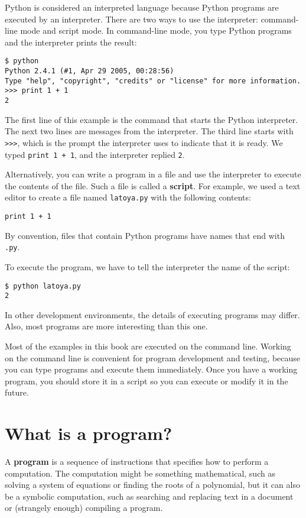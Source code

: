 Python is considered an interpreted language because Python
programs are executed by an interpreter.  There are two ways to
use the interpreter: command-line mode and script mode. In
command-line mode, you type Python programs and the interpreter
prints the result:

\pagebreak
\beforeverb
\begin{verbatim}
$ python
Python 2.4.1 (#1, Apr 29 2005, 00:28:56)
Type "help", "copyright", "credits" or "license" for more information.
>>> print 1 + 1
2
\end{verbatim}
\afterverb
%
The first line of this example is the command that starts the
Python interpreter.  The next two lines are messages from the
interpreter.  The third line starts with {\tt >>>}, which is the
prompt the interpreter uses to indicate that it is ready.  We typed
{\tt print 1 + 1}, and the interpreter replied {\tt 2}.

Alternatively, you can write a program in a file and use the
interpreter to execute the contents of the file.  Such a file is
called a {\bf script}.  For example, we used a text editor to
create a file named {\tt latoya.py} with the following contents:


\beforeverb
\begin{verbatim}
print 1 + 1
\end{verbatim}
\afterverb
%
By convention, files that contain Python programs have names that
end with {\tt .py}.

To execute the program, we have to tell the interpreter the name of
the script:


\beforeverb
\begin{verbatim}
$ python latoya.py
2
\end{verbatim}
\afterverb
%
In other development environments, the details of executing programs
may differ.  Also, most programs are more interesting than this one.

Most of the examples in this book are executed on the command line.
Working on the command line is convenient for program development and
testing, because you can type programs and execute them
immediately.  Once you have a working program, you should store
it in a script so you can execute or modify it in the future.


\section{What is a program?}

A {\bf program} is a sequence of instructions that specifies how to
perform a computation.  The computation might be something
mathematical, such as solving a system of equations or finding the
roots of a polynomial, but it can also be a symbolic computation, such
as searching and replacing text in a document or (strangely enough)
compiling a program.

